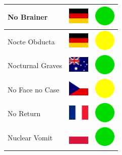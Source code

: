 \documentclass[12pt, a4paper, twoside]{report}
\begin{document}
\begin{center}
\begin{longtable}{|p{5cm}|p{2cm}|p{2cm}|}
 No Brainer                                                 & \includegraphics[width=1cm]{../4x3/de} &   \includegraphics[width=1cm]{../likes/y} \\ \hline
 Nocte Obducta                                              & \includegraphics[width=1cm]{../4x3/de} &   \includegraphics[width=1cm]{../likes/m} \\ \hline
 Nocturnal Graves                                           & \includegraphics[width=1cm]{../4x3/au} &   \includegraphics[width=1cm]{../likes/y} \\ \hline
 No Face no Case                                            & \includegraphics[width=1cm]{../4x3/cz} &   \includegraphics[width=1cm]{../likes/m} \\ \hline
 No Return                                                  & \includegraphics[width=1cm]{../4x3/fr} &   \includegraphics[width=1cm]{../likes/y} \\ \hline
 Nuclear Vomit                                              & \includegraphics[width=1cm]{../4x3/pl} &   \includegraphics[width=1cm]{../likes/y} \\ \hline

\end{longtable}
\end{center}
\end{document}
